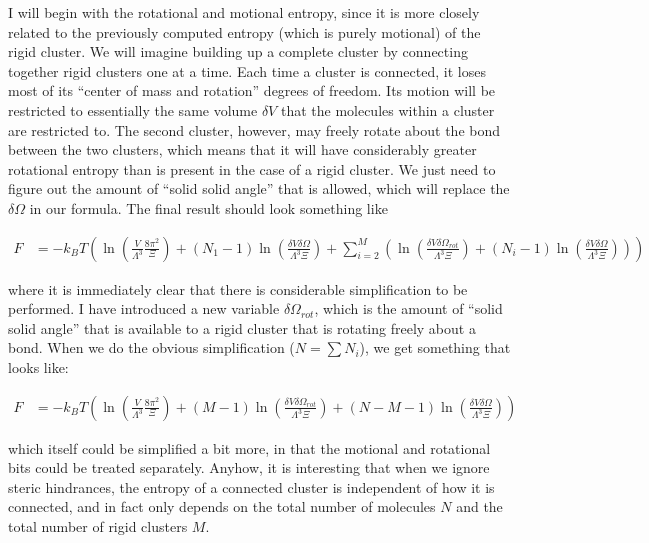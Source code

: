 \documentclass[letterpaper,twocolumn,amsmath,amssymb,pre]{revtex4-1}
\begin{document}
I will begin with the rotational and motional entropy, since it is
more closely related to the previously computed entropy (which is
purely motional) of the rigid cluster.  We will imagine building up a
complete cluster by connecting together rigid clusters one at a time.
Each time a cluster is connected, it loses most of its ``center of mass and
rotation'' degrees of freedom.  Its motion will be restricted to
essentially the same volume $\delta V$ that the molecules within a
cluster are restricted to.  The second cluster, however, may freely
rotate about the bond between the two clusters, which means that it
will have considerably greater rotational entropy than is present in
the case of a rigid cluster.  We just need to figure out the amount of
``solid solid angle'' that is allowed, which will replace the $\delta
\Omega$ in our formula.  The final result should look something like
\begin{widetext}
\begin{align}
  F &= -k_BT\left(
    \ln\left(
     \frac{V}{\Lambda^3}\frac{8\pi^2}{\Xi}
    \right)
    +
    (N_1-1)
    \ln\left(
     \frac{\delta V \delta \Omega}{\Lambda^3\Xi}
    \right)
    +
    \sum_{i=2}^{M} \left(
        \ln\left(\frac{\delta V
          \delta\Omega_{\textit{rot}}}{\Lambda^3\Xi}\right)
        +
        (N_i-1)
        \ln\left(
         \frac{\delta V \delta \Omega}{\Lambda^3\Xi}
        \right)
    \right)
  \right)
\end{align}
\end{widetext}
where it is immediately clear that there is considerable
simplification to be performed.  I have introduced a new variable
$\delta\Omega_{\textit{rot}}$, which is the amount of ``solid solid
angle'' that is available to a rigid cluster that is rotating freely
about a bond.  When we do the obvious simplification ($N = \sum N_i$),
we get something that looks like:
\begin{widetext}
\begin{align}
  F &= -k_BT\left(
    \ln\left(
     \frac{V}{\Lambda^3}\frac{8\pi^2}{\Xi}
    \right)
    +
    (M-1)
     \ln\left(\frac{\delta V
       \delta\Omega_{\textit{rot}}}{\Lambda^3\Xi}\right)
    +
    (N-M-1)
    \ln\left(
      \frac{\delta V \delta \Omega}{\Lambda^3\Xi}
    \right)
  \right)
\end{align}
\end{widetext}
which itself could be simplified a bit more, in that the motional and
rotational bits could be treated separately.  Anyhow, it is
interesting that when we ignore steric hindrances, the entropy of a
connected cluster is independent of how it is connected, and in fact
only depends on the total number of molecules $N$ and the total number
of rigid clusters $M$.
\end{document}
